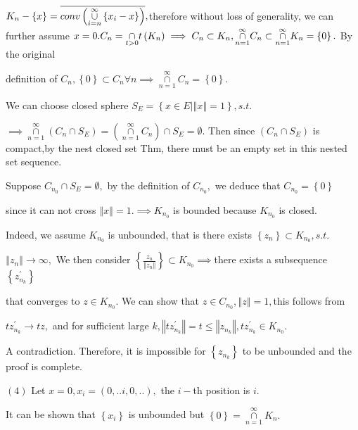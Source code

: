 \documentclass{article}
\begin{document}
$K_{n}-\left\{ x\right\} =\overline{conv\left( \underset{i=n}{\overset{%
\infty }{\cup }}\left\{ x_{i}-x\right\} \right) },$therefore without loss of
generality, we can further assume $x=0.C_{n}=\underset{t>0}{\cap }t\left(
K_{n}\right) \implies C_{n}\subset K_{n},\underset{n=1}{\overset{\infty }{%
\cap }}C_{n}\subset \underset{n=1}{\overset{\infty }{\cap }}K_{n}=\left\{
0\right\} .$ By the original 

definition of $C_{n},\left\{ 0\right\} \subset C_{n}\forall n\implies 
\underset{n=1}{\overset{\infty }{\cap }}C_{n}=\left\{ 0\right\} .$

We can choose closed sphere $S_{E}=\left\{ x\in E|\left\Vert x\right\Vert
=1\right\} ,s.t.$

$\implies \underset{n=1}{\overset{\infty }{\cap }}\left( C_{n}\cap
S_{E}\right) =\left( \underset{n=1}{\overset{\infty }{\cap }}C_{n}\right)
\cap S_{E}=\emptyset .$ Then since $\left( C_{n}\cap S_{E}\right) $ is
compact,by the nest closed set Thm, there must be an empty set in this
nested set sequence.

Suppose $C_{n_{0}}\cap S_{E}=\emptyset ,$ by the definition of $C_{n_{0}},$
we deduce that $C_{n_{0}}=\left\{ 0\right\} $

since it can not cross $\left\Vert x\right\Vert =1.\implies K_{n_{0}}$ is
bounded because $K_{n_{0}}$ is closed. 

Indeed, we assume $K_{n_{0}}$ is unbounded, that is there exists $\left\{
z_{n}\right\} \subset K_{n_{0}},s.t.$

$\left\Vert z_{n}\right\Vert \rightarrow \infty ,$ We then consider $\left\{ 
\frac{z_{n}}{\left\Vert z_{n}\right\Vert }\right\} \subset K_{n_{0}}\implies 
$there exists a subsequence $\left\{ z_{n_{k}}^{\prime }\right\} $

that converges to $z\in K_{n_{0}}.$ We can show that $z\in
C_{n_{0}},\left\Vert z\right\Vert =1,$this follows from

$tz_{n_{k}}^{\prime }\rightarrow tz,$ and for sufficient large $k,\left\Vert
tz_{n_{k}}^{\prime }\right\Vert =t\leq \left\Vert z_{n_{k}}\right\Vert
,tz_{n_{k}}^{\prime }\in K_{n_{0}}.$

A contradiction. Therefore, it is impossible for $\left\{ z_{n_{k}}\right\} $
to be unbounded and the proof is complete.

$\left( 4\right) $ Let $x=0,x_{i}=\left( 0,..i,0,..\right) ,$ the $i-$th
position is $i$.

It can be shown that $\left\{ x_{i}\right\} $ is unbounded but $\left\{
0\right\} =\underset{n=1}{\overset{\infty }{\cap }}K_{n}.$
\end{document}
